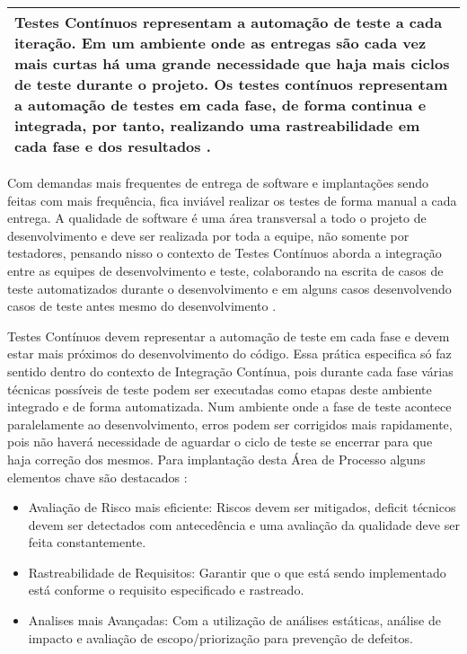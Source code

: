 \begin{table}[!ht]
\centering
\begin{tabular}{|p{130mm}|}
\hline
Testes Contínuos representam a automação de teste a cada iteração. Em um ambiente onde as entregas são cada vez mais curtas há uma grande necessidade que haja mais ciclos de teste durante o projeto. Os testes contínuos representam a automação de testes em cada fase, de forma continua e integrada, por tanto, realizando uma rastreabilidade em cada fase e dos resultados \cite{humble2010}. \\
\hline
\end{tabular}
\end{table}

Com demandas mais frequentes de entrega de software e implantações sendo feitas com mais frequência, fica inviável realizar os testes de forma manual a cada entrega. A qualidade de software é uma área transversal a todo o projeto de desenvolvimento e deve ser realizada por toda a equipe, não somente por testadores, pensando nisso o contexto de Testes Contínuos aborda a integração entre as equipes de desenvolvimento e teste, colaborando na escrita de casos de teste automatizados durante o desenvolvimento e em alguns casos desenvolvendo casos de teste antes mesmo do desenvolvimento \cite{humble2010}.

Testes Contínuos devem representar a automação de teste em cada fase e devem estar mais próximos do desenvolvimento do código. Essa prática especifica só faz sentido dentro do contexto de Integração Contínua, pois durante cada fase várias técnicas possíveis de teste podem ser executadas como etapas deste ambiente integrado e de forma automatizada. Num ambiente onde a fase de teste acontece paralelamente ao desenvolvimento, erros podem ser corrigidos mais rapidamente, pois não haverá necessidade de aguardar o ciclo de teste se encerrar para que haja correção dos mesmos. Para implantação desta Área de Processo alguns elementos chave são destacados \cite{ContinuousTestIT}:

\begin{itemize}
	\item Avaliação de Risco mais eficiente: Riscos devem ser mitigados, deficit técnicos devem ser detectados com antecedência e uma avaliação da qualidade deve ser feita constantemente.  
	\item Rastreabilidade de Requisitos: Garantir que o que está sendo implementado está conforme o requisito especificado e rastreado.
	\item Analises mais Avançadas: Com a utilização de análises estáticas, análise de impacto e avaliação de escopo/priorização para prevenção de defeitos.
\end{itemize}


